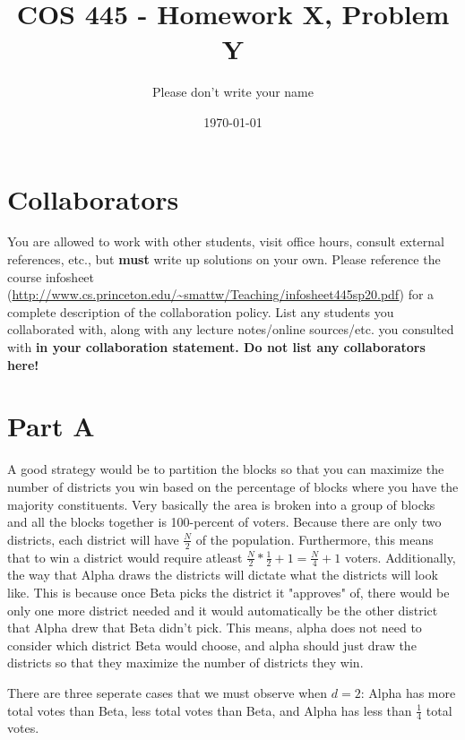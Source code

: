 \documentclass[12pt]{article}%
\begin{document}
\title{COS 445 - Homework X, Problem Y} %
\author{Please don't write your name} %
\date{\today}
\maketitle
\section*{Collaborators}
You are allowed to work with other students, visit office hours, consult external references, etc., but \textbf{must} write up solutions on your own.  Please reference the course infosheet (\url{http://www.cs.princeton.edu/~smattw/Teaching/infosheet445sp20.pdf}) for a complete description of the collaboration policy. List any students you collaborated with, along with any lecture notes/online sources/etc. you consulted with \textbf{in your collaboration statement. Do not list any collaborators here!}

\section*{Part A}

A good strategy would be to partition the blocks so that you can maximize the number of districts you win based on the percentage of blocks where you have the majority constituents. Very basically the area is broken into a group of blocks and all the blocks together is 100-percent of voters. Because there are only two districts, each district will have $\frac{N}{2}$ of the population.  Furthermore, this means that to win a district would require atleast $\frac{N}{2} * \frac{1}{2} + 1 = \frac{N}{4}+1$ voters.  Additionally, the way that Alpha draws the districts will dictate what the districts will look like.  This is because once Beta picks the district it "approves" of, there would be only one more district needed and it would automatically be the other district that Alpha drew that Beta didn't pick. This means, alpha does not need to consider which district Beta would choose, and alpha should just draw the districts so that they maximize the number of districts they win.
\newline

There are three seperate cases that we must observe when $d = 2$:  Alpha has more total votes than Beta, less total votes than Beta, and Alpha has less than $\frac{1}{4}$ total votes.  
\newline
\end{document}
